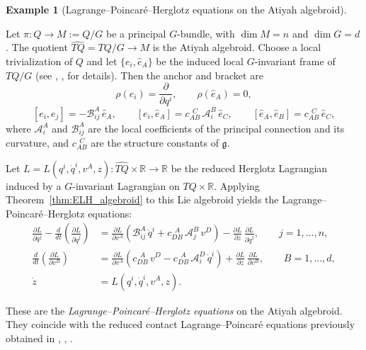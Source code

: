 \documentclass[11pt,a4paper]{article}
\theoremstyle{definition}
\newtheorem{example}[theorem]{Example}
\begin{document}
\begin{example}[Lagrange--Poincaré--Herglotz equations on the Atiyah algebroid]
\label{example:LPH-Atiyah}

Let $\pi\colon Q\to M:=Q/G$ be a principal $G$-bundle, with $\dim M=n$ and 
$\dim G=d$.  
The quotient $\widehat{TQ}=TQ/G\to M$ is the Atiyah algebroid.  
Choose a local trivialization of $Q$ and let 
$\{e_i,\widehat e_A\}$ be the induced local $G$-invariant frame of $TQ/G$ 
(see \cite{anahory2024euler}, \cite{simoes2024symmetry}, \cite{anahory2025contact} for details).  
Then the anchor and bracket are
\[
\rho(e_i)=\frac{\partial}{\partial q^i},
\qquad 
\rho(\widehat e_A)=0,
\]
\[
[e_i,e_j] = -\mathcal{B}_{ij}^{A}\,\widehat e_A,\qquad
[e_i,\widehat e_A] = c_{AB}^{\ \ C}\,\mathcal{A}_{i}^{B}\,\widehat e_C,\qquad
[\widehat e_A,\widehat e_B]=c_{AB}^{\ \ C}\,\widehat e_C,
\]
where $\mathcal{A}_i^A$ and $\mathcal{B}_{ij}^A$ are the local coefficients of the principal 
connection and its curvature, and $c_{AB}^{\ \ C}$ are the structure constants of $\mathfrak g$.

Let $L=L(q^i,\dot q^i,v^A,z)\colon \widehat{TQ}\times\mathbb{R}\to\mathbb{R}$ be the reduced Herglotz Lagrangian induced by a $G$-invariant Lagrangian on 
$TQ\times\mathbb{R}$.  
Applying Theorem~\ref{thm:ELH_algebroid} to this Lie algebroid yields the 
Lagrange--Poincaré--Herglotz equations:
\begin{align}
\frac{\partial L}{\partial q^{j}}
 - \frac{d}{dt}\!\left(\frac{\partial L}{\partial \dot{q}^{j}}\right)
&=
\frac{\partial L}{\partial v^{A}}
\left(\mathcal{B}_{ij}^{A}\,\dot{q}^{i}
+ c_{DB}^{\ \ A}\,\mathcal{A}_{j}^{B}\,v^{D}\right)
 - \frac{\partial L}{\partial z}\,\frac{\partial L}{\partial \dot{q}^{j}},
\qquad j=1,\dots,n,
\label{eq:LPH-horizontal-Atiyah}
\\[0.4em]
\frac{d}{dt}\!\left(\frac{\partial L}{\partial v^{B}}\right)
&=
\frac{\partial L}{\partial v^{A}}
\left(c_{DB}^{\ \ A}\,v^{D}
 - c_{DB}^{\ \ A}\,\mathcal{A}_{i}^{D}\,\dot{q}^{i}\right)
 + \frac{\partial L}{\partial z}\,\frac{\partial L}{\partial v^{B}},
\qquad B=1,\dots,d,
\label{eq:LPH-vertical-Atiyah}
\\[0.4em]
\dot{z} &= L(q^i,\dot q^i,v^A,z).
\label{eq:LPH-contact-Atiyah}
\end{align}

These are the \emph{Lagrange--Poincaré--Herglotz equations} on the Atiyah algebroid.  
They coincide with the reduced contact Lagrange--Poincaré equations previously obtained in 
\cite{anahory2024euler}, \cite{simoes2024symmetry}, \cite{anahory2025contact}.
\end{example}
\end{document}
